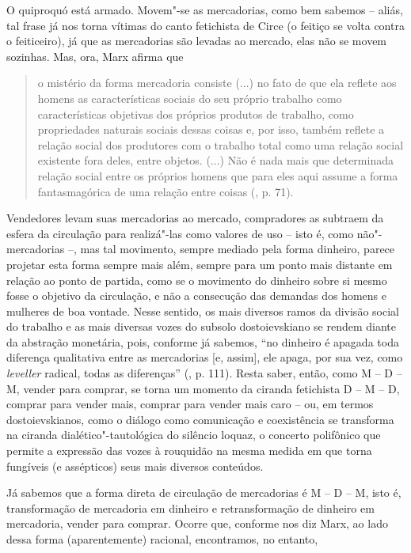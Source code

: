 {O quiproquó está armado. Movem"-se as mercadorias, como bem sabemos --
aliás, tal frase já nos torna vítimas do canto fetichista de Circe (o
feitiço se volta contra o feiticeiro), já que as mercadorias são levadas
ao mercado, elas não se movem sozinhas. Mas, ora, Marx afirma que

\begin{quote}
o mistério da forma mercadoria consiste (...) no fato de que ela reflete
aos homens as características sociais do seu próprio trabalho como
características objetivas dos próprios produtos de trabalho, como
propriedades naturais sociais dessas coisas e, por isso, também reflete
a relação social dos produtores com o trabalho total como uma relação
social existente fora deles, entre objetos. (...) Não é nada mais que
determinada relação social entre os próprios homens que para eles aqui
assume a forma fantasmagórica de uma relação entre coisas (, p. 71).
\end{quote}

Vendedores levam suas mercadorias ao mercado, compradores as subtraem da
esfera da circulação para realizá"-las como valores de uso -- isto é,
como não"-mercadorias --, mas tal movimento, sempre mediado pela forma
dinheiro, parece projetar esta forma sempre mais além, sempre para um
ponto mais distante em relação ao ponto de partida, como se o movimento
do dinheiro sobre si mesmo fosse o objetivo da circulação, e não a
consecução das demandas dos homens e mulheres de boa vontade. Nesse
sentido, os mais diversos ramos da divisão social do trabalho e as mais
diversas vozes do subsolo dostoievskiano se rendem diante da abstração
monetária, pois, conforme já sabemos, ``no dinheiro é apagada toda
diferença qualitativa entre as mercadorias {[}e, assim{]}, ele apaga,
por sua vez, como \emph{leveller} radical, todas as diferenças'' (,
p. 111). Resta saber, então, como M -- D -- M, vender para comprar, se
torna um momento da ciranda fetichista D -- M -- D, comprar para vender
mais, comprar para vender mais caro -- ou, em termos dostoievskianos,
como o diálogo como comunicação e coexistência se transforma na ciranda
dialético"-tautológica do silêncio loquaz, o concerto polifônico que
permite a expressão das vozes à rouquidão na mesma medida em que torna
fungíveis (e assépticos) seus mais diversos conteúdos.

Já sabemos que a forma direta de circulação de mercadorias é M -- D --
M, isto é, transformação de mercadoria em dinheiro e retransformação de
dinheiro em mercadoria, vender para comprar. Ocorre que, conforme nos
diz Marx, ao lado dessa forma (aparentemente) racional, encontramos, no
entanto,

}
